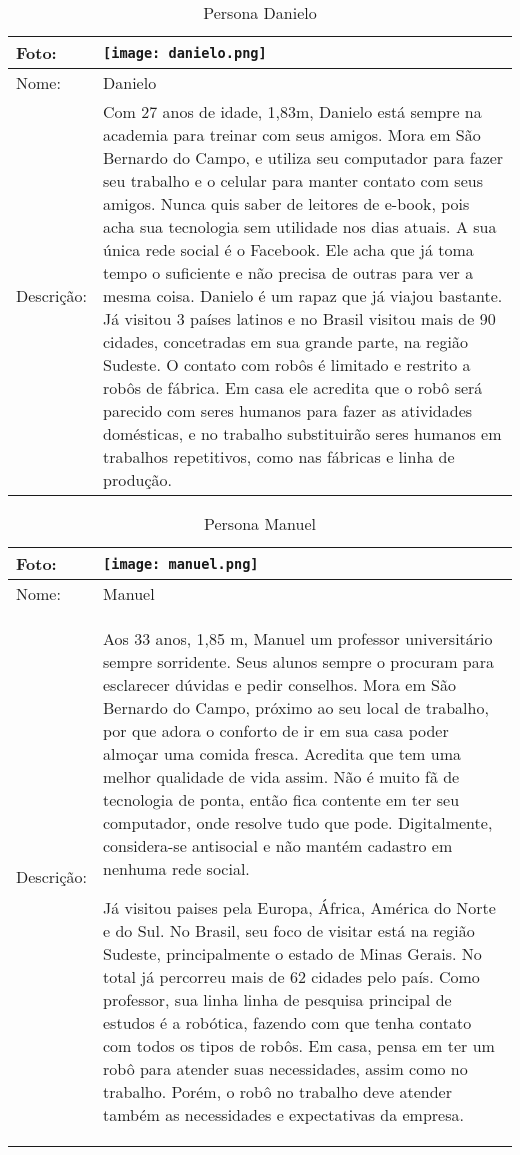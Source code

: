 \begin{table}[!ht]
	\caption{Persona Danielo}
	\label{tab:danielo}
	\centering
	\begin{tabular}{ m{2 cm} | m{13cm} }
		\hline
		Foto: & \rule{0cm}{2.7cm} \texttt{[image: danielo.png]} \\
		\hline
		Nome: & Danielo \\
		\hline
		Descrição: & Com 27 anos de idade, 1,83m, Danielo está sempre na academia para treinar com seus amigos. Mora em São Bernardo do Campo, e utiliza seu computador para fazer seu trabalho e o celular para manter contato com seus amigos. Nunca quis saber de leitores de e-book, pois acha sua tecnologia sem utilidade nos dias atuais. A sua única rede social é o Facebook. Ele acha que já toma tempo o suficiente e não precisa de outras para ver a mesma coisa. Danielo é um rapaz que já viajou bastante. Já visitou 3 países latinos e no Brasil visitou mais de 90 cidades, concetradas em sua grande parte, na região Sudeste. O contato com robôs é limitado e restrito a robôs de fábrica. Em casa ele acredita que o robô será parecido com seres humanos para fazer as atividades domésticas, e no trabalho substituirão seres humanos em trabalhos repetitivos, como nas fábricas e linha de produção.\\
		\hline
	\end{tabular}
\end{table}

\begin{table}[!ht]
	\caption{Persona Manuel}
	\label{tab:manuel}
	\centering
	\begin{tabular}{ m{2 cm} | m{13cm} }
		\hline
		Foto: & \rule{0cm}{2.7cm} \texttt{[image: manuel.png]} \\
		\hline
		Nome: & Manuel \\
		\hline
		Descrição: & Aos 33 anos, 1,85 m,  Manuel um professor universitário sempre sorridente. Seus alunos sempre o procuram para esclarecer dúvidas e pedir conselhos. Mora em São Bernardo do Campo, próximo ao seu local de trabalho, por que adora o conforto de ir em sua casa poder almoçar uma comida fresca. Acredita que tem uma melhor qualidade de vida assim. Não é muito fã de tecnologia de ponta, então fica contente em ter seu computador, onde resolve tudo que pode. Digitalmente, considera-se antisocial e não mantém cadastro em nenhuma rede social.

		Já visitou paises pela Europa, África, América do Norte e do Sul. No Brasil, seu foco de visitar está na região Sudeste, principalmente o estado de Minas Gerais. No total já percorreu mais de 62 cidades pelo país. Como professor, sua linha linha de pesquisa principal de estudos é a robótica, fazendo com que tenha contato com todos os tipos de robôs. Em casa, pensa em ter um robô para atender suas necessidades, assim como no trabalho. Porém, o robô no trabalho deve atender também as necessidades e expectativas da empresa.\\
		\hline
	\end{tabular}
\end{table}

